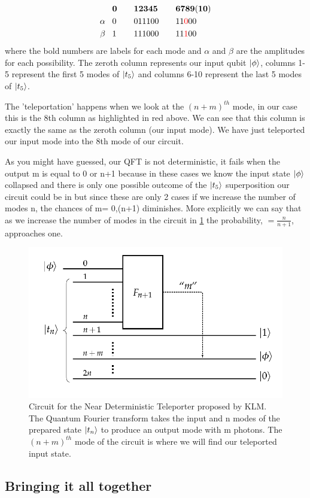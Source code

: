 \begin{alignat*}{0}
        &\mathbf{0} \quad  &  &\mathbf{1 2 3 4 5}  \quad &  &\mathbf{6 7 8 9 (10)}\\
        \alpha \;\;\;  &0 \quad &  &0 1 1 1 0 0  \quad  &  &1 1 {\color{red}0} 0 0 \\
        \beta  \;\;\; &1 \quad  &  &1 1 1 0 0 0 \quad &  &1 1 {\color{red}1} 0 0 \\
\end{alignat*}
where the bold numbers are labels for each mode and $\alpha$ and $\beta$ are the amplitudes for each possibility. The zeroth column represents our input qubit $\ket{\phi}$, columns 1-5 represent the first 5 modes of $\ket{t_5}$ and columns 6-10 represent the last 5 modes of $\ket{t_5}$.
\par
The 'teleportation' happens when we look at the $(n+m)^{th}$ mode, in our case this is the 8th column as highlighted in red above.  We can see that this column is exactly the same as the zeroth column (our input mode). We have just teleported our input mode into the 8th mode of our circuit. 
\par
As you might have guessed, our QFT is not deterministic, it fails when the output m is equal to 0 or n+1 because in these cases we know the input state $\ket{\phi}$ collapsed and there is only one possible outcome of the $\ket{t_5}$ superposition our circuit could be in but since these are only 2 cases if we increase the number of modes n, the chances of m= 0,(n+1) diminishes. More explicitly we can say that as we increase the number of modes in the circuit in \cref{fig:Near deterministic tele} the probability, $= \frac{n}{n+1}$, approaches one.

\begin{figure}[H]
    \centering
    \includegraphics[scale=0.5]{images/Near Deterministic Teleporter.png}
    \caption{Circuit for the Near Deterministic Teleporter proposed by KLM. The Quantum Fourier transform takes the input and n modes of the prepared state $\ket{t_n}$ to produce an output mode with m photons. The $(n+m)^{th}$ mode of the circuit is where we will find our teleported input state.}
    \label{fig:Near deterministic tele}
\end{figure}

\subsection{Bringing it all together}
